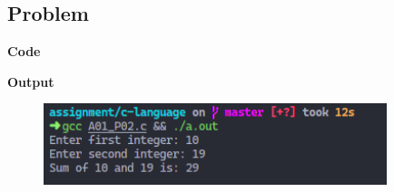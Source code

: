 \subsection{Problem}
\textbf{Code}



\textbf{Output}

\begin{figure}[h]
  \includegraphics[width=10cm]{outputs/A01_P02.png}
\end{figure}

\newpage

